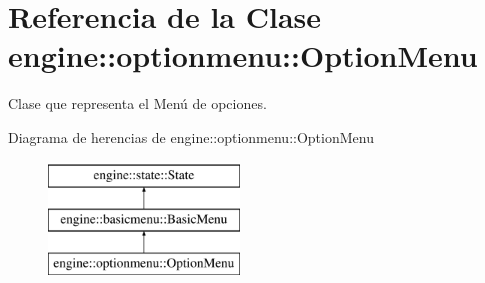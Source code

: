 \hypertarget{classengine_1_1optionmenu_1_1OptionMenu}{
\section{\-Referencia de la \-Clase engine\-:\-:optionmenu\-:\-:\-Option\-Menu}
\label{classengine_1_1optionmenu_1_1OptionMenu}
}


\-Clase que representa el \-Menú de opciones.  


\-Diagrama de herencias de engine\-:\-:optionmenu\-:\-:\-Option\-Menu\begin{figure}[H]
\begin{center}
\leavevmode
\includegraphics[height=3.000000cm]{classengine_1_1optionmenu_1_1OptionMenu}
\end{center}
\end{figure}
